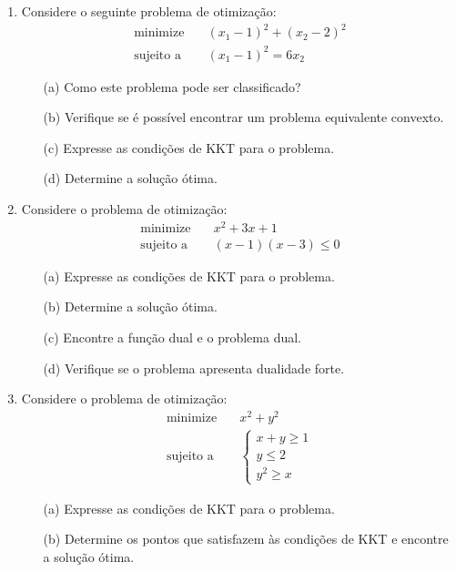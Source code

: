 \documentclass[11pt,a4paper]{article}
\begin{document}

\begin{enumerate}
    \item Considere o seguinte problema de otimização:
        \begin{align*}
            \text{minimize} & \quad (x_1 - 1)^2 + (x_2 - 2)^2\\
            \text{sujeito a} & \quad (x_1 - 1)^2 = 6x_2 
        \end{align*}
        \begin{itemize}
            \item[(a)] Como este problema pode ser classificado?
            \item[(b)] Verifique se é possível encontrar um problema equivalente convexto.
            \item[(c)] Expresse as condições de KKT para o problema.
            \item[(d)] Determine a solução ótima.
        \end{itemize}
    \item Considere o problema de otimização:
        \begin{align*}
            \text{minimize} & \quad x^2 + 3x + 1\\
            \text{sujeito a} & \quad (x - 1)(x - 3) \leq 0
        \end{align*}
        \begin{itemize}
            \item[(a)] Expresse as condições de KKT para o problema.
            \item[(b)] Determine a solução ótima.
            \item[(c)] Encontre a função dual e o problema dual.
            \item[(d)] Verifique se o problema apresenta dualidade forte.
        \end{itemize}
    \item Considere o problema de otimização:
        \begin{align*}
            \text{minimize} & \quad x^2 + y^2\\
            \text{sujeito a} & \quad \begin{cases}
                x + y \geq 1\\
                y \leq 2\\
                y^2 \geq x
            \end{cases}
        \end{align*}
        \begin{itemize}
            \item[(a)] Expresse as condições de KKT para o problema.
            \item[(b)] Determine os pontos que satisfazem às condições de KKT e encontre a solução ótima.
        \end{itemize}
\end{enumerate}
\end{document}
